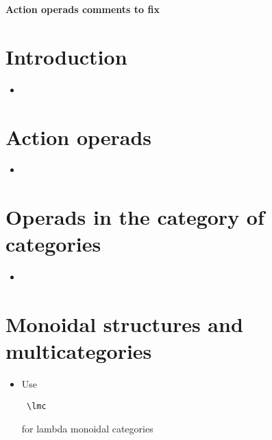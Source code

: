 \documentclass{amsart}
\begin{document}
\begin{center}
\begin{Large}
\textbf{Action operads comments to fix}
\end{Large}
\end{center}
\vskip1cm

\section{ Introduction}
\begin{itemize}
\item

\end{itemize}
\section{ Action operads}
\begin{itemize}
\item

\end{itemize}

\section{Operads in the category of categories}
\begin{itemize}
\item

\end{itemize}

\section{ Monoidal structures and multicategories}
\begin{itemize}
\item Use \begin{verbatim} \lmc \end{verbatim} for lambda monoidal categories

\end{itemize}
\end{document}
